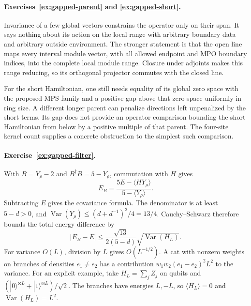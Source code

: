 \paragraph{Exercises~\ref{ex:gapped-parent} and \ref{ex:gapped-short}.}
\label{sol:ex:gapped-parent}
\label{sol:ex:gapped-short}
Invariance of a few global vectors constrains the operator only
on their span. It says nothing about its action on the local
range with arbitrary boundary data and arbitrary outside
environment. The stronger statement is that the open line
maps every interval module vector, with all allowed endpoint
and MPO boundary indices, into the complete local module
range. Closure under adjoints makes this range reducing, so
its orthogonal projector commutes with the closed line.

For the short Hamiltonian, one still needs equality of its
global zero space with the proposed MPS family and a positive
gap above that zero space uniformly in ring size. A different
longer parent can penalize directions left unpenalized by the
short terms. Its gap does not provide an operator comparison
bounding the short Hamiltonian from below by a positive
multiple of that parent. The four-site kernel count supplies
a concrete obstruction to the simplest such comparison.



\paragraph{Exercise~\ref{ex:gapped-filter}.}
\label{sol:ex:gapped-filter}
With $B=Y_\rho-2$ and $B^\dagger B=5-Y_\rho$, commutation
with $H$ gives
\[
 E_B=\frac{5E-\langle HY_\rho\rangle}
                  {5-\langle Y_\rho\rangle}.
\]
Subtracting $E$ gives the covariance formula. The denominator
is at least $5-d>0$, and
$\operatorname{Var}(Y_\rho)\leq(d+d^{-1})^2/4=13/4$.
Cauchy--Schwarz therefore bounds the total energy difference
by
\[
 |E_B-E|\leq
 \frac{\sqrt{13}}{2(5-d)}
       \sqrt{\operatorname{Var}(H_L)}.
\]
For variance $O(L)$, division by $L$ gives $O(L^{-1/2})$.
A cat with nonzero weights on branches of densities $e_1\ne e_2$
has a contribution $w_1w_2(e_1-e_2)^2L^2$ to the variance.
For an explicit example, take $H_L=\sum_jZ_j$ on qubits and
$(|0\rangle^{\otimes L}+|1\rangle^{\otimes L})/\sqrt2$.
The branches have energies $L,-L$, so $\langle H_L\rangle=0$
and $\operatorname{Var}(H_L)=L^2$.



